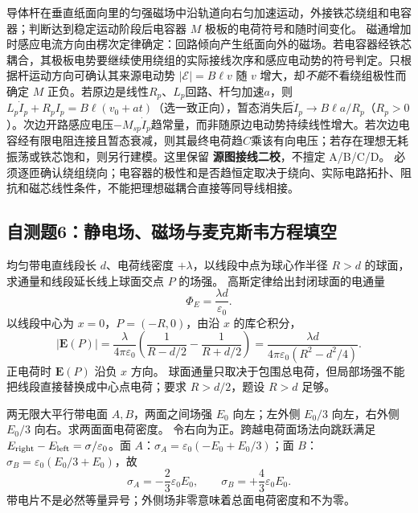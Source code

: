 \problemtext 导体杆在垂直纸面向里的匀强磁场中沿轨道向右匀加速运动，外接铁芯绕组和电容器；判断达到稳定运动阶段后电容器 $M$ 极板的电荷符号和随时间变化。
\workings 磁通增加时感应电流方向由楞次定律确定：回路倾向产生纸面向外的磁场。若电容器经铁芯耦合，其极板电势要继续使用绕组的实际接线次序和感应电动势的符号判定。只根据杆运动方向可确认其来源电动势 $|\mathcal E|=B\ell v$ 随 $v$ 增大，却\emph{不能}不看绕组极性而确定 $M$ 正负。若原边是线性$R_p$、$L_p$回路、杆匀加速$a$，则$L_p\dot I_p+R_p I_p=B\ell(v_0+at)$（选一致正向），暂态消失后$\dot I_p\to B\ell a/R_p$（$R_p>0$）。次边开路感应电压$-M_{sp}\dot I_p$趋常量，而非随原边电动势持续线性增大。若次边电容经有限电阻连接且暂态衰减，则其最终电荷趋$C$乘该有向电压；若存在理想无耗振荡或铁芯饱和，则另行建模。这里保留 \textbf{源图接线二校}，不擅定 A/B/C/D。
\crosscheck 必须逐匝确认绕组绕向；电容器的极性和是否趋恒定取决于绕向、实际电路拓扑、阻抗和磁芯线性条件，不能把理想磁耦合直接等同导线相接。

\subsection{自测题6：静电场、磁场与麦克斯韦方程填空}

\problemtext 均匀带电直线段长 $d$、电荷线密度 $+\lambda$，以线段中点为球心作半径 $R>d$ 的球面，求通量和线段延长线上球面交点 $P$ 的场强。
\workings 高斯定律给出封闭球面的电通量
\[\boxed{\Phi_E=\frac{\lambda d}{\varepsilon_0}}.\]
以线段中心为 $x=0$，$P=(-R,0)$，由沿 $x$ 的库仑积分，
\[\boxed{|\bm E(P)|=\frac{\lambda}{4\pi\varepsilon_0}
\left(\frac1{R-d/2}-\frac1{R+d/2}\right)
=\frac{\lambda d}{4\pi\varepsilon_0(R^2-d^2/4)}}.\]
正电荷时 $\bm E(P)$ 沿负 $x$ 方向。
\crosscheck 球面通量只取决于包围总电荷，但局部场强不能把线段直接替换成中心点电荷；要求 $R>d/2$，题设 $R>d$ 足够。

\problemtext 两无限大平行带电面 $A,B$，两面之间场强 $E_0$ 向左；左外侧 $E_0/3$ 向左，右外侧 $E_0/3$ 向右。求两面面电荷密度。
\workings 令右向为正。跨越电荷面场法向跳跃满足 $E_{\rm right}-E_{\rm left}=\sigma/\varepsilon_0$。面 $A$：$\sigma_A=\varepsilon_0(-E_0+E_0/3)$；面 $B$：$\sigma_B=\varepsilon_0(E_0/3+E_0)$，故
\[\boxed{\sigma_A=-\frac23\varepsilon_0E_0,\qquad \sigma_B=+\frac43\varepsilon_0E_0}.\]
\crosscheck 带电片不是必然等量异号；外侧场非零意味着总面电荷密度和不为零。

